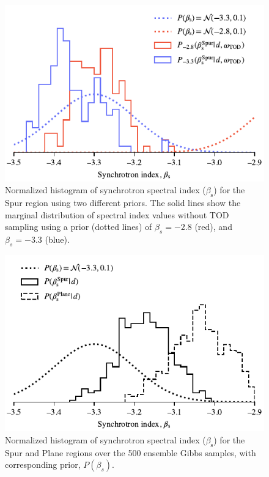\documentclass[twocolumn]{aa}
\newcommand{\?}[1]{\textcolor{red}{{\bf [#1]}}}
\begin{document}
\begin{figure}[t]
\center
\includegraphics[width=\linewidth]{figs/synch-beta_pixreg_val_spur_prior_histogram.pdf}
\caption{Normalized histogram of synchrotron spectral index ($\beta_{\mathrm s}$) for
the Spur region using two different priors. The solid lines show the marginal distribution of spectral index values without TOD sampling using a prior (dotted lines) of $\beta_{s}=-2.8$ (red), and $\beta_{s}=-3.3$ (blue).}
\label{fig:synchbetaspurpriorhist}
\vspace*{3.23mm}
\end{figure} 
  
\begin{figure}[t]
\center
\includegraphics[width=\linewidth]{figs/synch-beta_pixreg_val_histogram.pdf}
\caption{Normalized histogram of synchrotron spectral index ($\beta_{\mathrm s}$) for the Spur and Plane regions over the 500 ensemble Gibbs samples, with corresponding prior, $P(\beta_s)$.}\label{fig:synchbetahist}
\end{figure}
 
\end{document}
